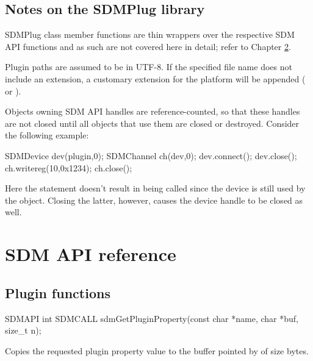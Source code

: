 \documentclass[a4paper,12pt,twoside,extrafontsizes]{memoir}
\begin{document}
\section{Notes on the SDMPlug library}

SDMPlug class member functions are thin wrappers over the respective SDM API functions and as such are not covered here in detail; refer to Chapter \ref{ch:sdmapireference}.

Plugin paths are assumed to be in UTF-8. If the specified file name does not include an extension, a customary extension for the platform will be appended ( or ).

Objects owning SDM API handles are reference-counted, so that these handles are not closed until all objects that use them are closed or destroyed. Consider the following example:

\begin{breakshellcmds}\begin{ccode}
SDMDevice dev(plugin,0);
SDMChannel ch(dev,0);
dev.connect();
dev.close();
ch.writereg(10,0x1234);
ch.close();
\end{ccode}\end{breakshellcmds}

Here the  statement doesn't result in  being called since the device is still used by the  object. Closing the latter, however, causes the device handle to be closed as well.

\chapter{SDM API reference}
\label{ch:sdmapireference}

\section{Plugin functions}



\begin{cfuncprototype}
SDMAPI int SDMCALL sdmGetPluginProperty(const char *name, char *buf, size_t n);
\end{cfuncprototype}

\begin{funcdescr}
	Copies the requested plugin property value to the buffer pointed by  of size  bytes.
\end{funcdescr}
\end{document}
